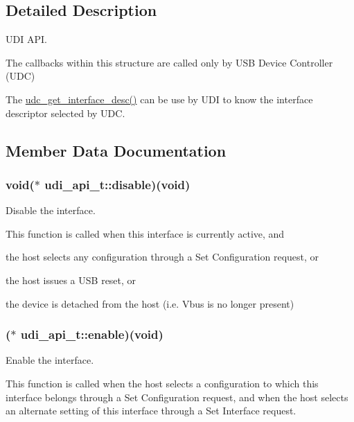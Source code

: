 \subsection{Detailed Description}
U\-D\-I A\-P\-I. 

The callbacks within this structure are called only by U\-S\-B Device Controller (U\-D\-C)

The \hyperlink{group__udc__group__interne_gadb2a0f5ad1e834d4d7e7777f901d64d2}{udc\-\_\-get\-\_\-interface\-\_\-desc()} can be use by U\-D\-I to know the interface descriptor selected by U\-D\-C. 

\subsection{Member Data Documentation}
\hypertarget{structudi__api__t_ab0ceaf0d506a357091ec69d5868bff7d}{
\subsubsection[{disable}]{\setlength{\rightskip}{0pt plus 5cm}void($\ast$ udi\-\_\-api\-\_\-t\-::disable)(void)}}\label{structudi__api__t_ab0ceaf0d506a357091ec69d5868bff7d}


Disable the interface. 

This function is called when this interface is currently active, and
\begin{DoxyItemize}
\item the host selects any configuration through a Set Configuration request, or
\item the host issues a U\-S\-B reset, or
\item the device is detached from the host (i.\-e. Vbus is no longer present) 
\end{DoxyItemize}\hypertarget{structudi__api__t_a293117d7192553f153e0411b346dadc1}{
\subsubsection[{enable}]{($\ast$ udi\-\_\-api\-\_\-t\-::enable)(void)}}\label{structudi__api__t_a293117d7192553f153e0411b346dadc1}


Enable the interface. 

This function is called when the host selects a configuration to which this interface belongs through a Set Configuration request, and when the host selects an alternate setting of this interface through a Set Interface request.

